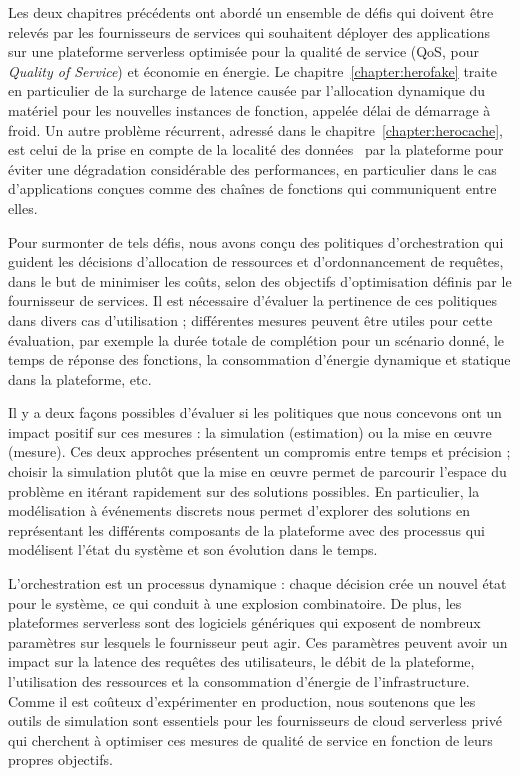Les deux chapitres précédents ont abordé un ensemble de défis qui doivent être relevés par les fournisseurs de services qui souhaitent déployer des applications sur une plateforme serverless optimisée pour la qualité de service (\gls{QoS}, pour \textit{Quality of Service}) et économie en énergie. Le chapitre~\ref{chapter:herofake} traite en particulier de la surcharge de latence causée par l'allocation dynamique du matériel pour les nouvelles instances de fonction, appelée délai de démarrage à froid. Un autre problème récurrent, adressé dans le chapitre~\ref{chapter:herocache}, est celui de la prise en compte de la localité des données~\cite{yuFollowingDataNot} par la plateforme pour éviter une dégradation considérable des performances, en particulier dans le cas d'applications conçues comme des chaînes de fonctions qui communiquent entre elles.

Pour surmonter de tels défis, nous avons conçu des politiques d'orchestration qui guident les décisions d'allocation de ressources et d'ordonnancement de requêtes, dans le but de minimiser les coûts, selon des objectifs d'optimisation définis par le fournisseur de services. Il est nécessaire d'évaluer la pertinence de ces politiques dans divers cas d'utilisation ; différentes mesures peuvent être utiles pour cette évaluation, par exemple la durée totale de complétion pour un scénario donné, le temps de réponse des fonctions, la consommation d'énergie dynamique et statique dans la plateforme, etc.


Il y a deux façons possibles d'évaluer si les politiques que nous concevons ont un impact positif sur ces mesures : la simulation (estimation) ou la mise en œuvre (mesure). Ces deux approches présentent un compromis entre temps et précision ; choisir la simulation plutôt que la mise en œuvre permet de parcourir l'espace du problème en itérant rapidement sur des solutions possibles. En particulier, la modélisation à événements discrets nous permet d'explorer des solutions en représentant les différents composants de la plateforme avec des processus qui modélisent l'état du système et son évolution dans le temps.

L'orchestration est un processus dynamique : chaque décision crée un nouvel état pour le système, ce qui conduit à une explosion combinatoire. De plus, les plateformes serverless sont des logiciels génériques qui exposent de nombreux paramètres sur lesquels le fournisseur peut agir. Ces paramètres peuvent avoir un impact sur la latence des requêtes des utilisateurs, le débit de la plateforme, l'utilisation des ressources et la consommation d'énergie de l'infrastructure. Comme il est coûteux d'expérimenter en production, nous soutenons que les outils de simulation sont essentiels pour les fournisseurs de cloud serverless privé qui cherchent à optimiser ces mesures de qualité de service en fonction de leurs propres objectifs.

